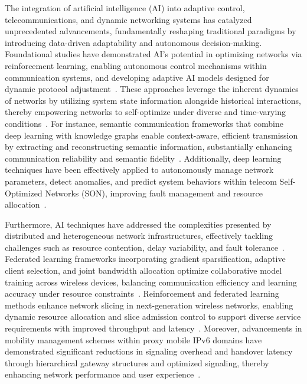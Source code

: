 \documentclass[sigconf]{acmart}
\begin{document}
The integration of artificial intelligence (AI) into adaptive control, telecommunications, and dynamic networking systems has catalyzed unprecedented advancements, fundamentally reshaping traditional paradigms by introducing data-driven adaptability and autonomous decision-making. Foundational studies have demonstrated AI's potential in optimizing networks via reinforcement learning, enabling autonomous control mechanisms within communication systems, and developing adaptive AI models designed for dynamic protocol adjustment~\cite{ref17,ref18,ref19,ref20}. These approaches leverage the inherent dynamics of networks by utilizing system state information alongside historical interactions, thereby empowering networks to self-optimize under diverse and time-varying conditions~\cite{ref1,ref2,ref3}. For instance, semantic communication frameworks that combine deep learning with knowledge graphs enable context-aware, efficient transmission by extracting and reconstructing semantic information, substantially enhancing communication reliability and semantic fidelity~\cite{ref1}. Additionally, deep learning techniques have been effectively applied to autonomously manage network parameters, detect anomalies, and predict system behaviors within telecom Self-Optimized Networks (SON), improving fault management and resource allocation~\cite{ref2}.

Furthermore, AI techniques have addressed the complexities presented by distributed and heterogeneous network infrastructures, effectively tackling challenges such as resource contention, delay variability, and fault tolerance~\cite{ref4,ref5,ref6}. Federated learning frameworks incorporating gradient sparsification, adaptive client selection, and joint bandwidth allocation optimize collaborative model training across wireless devices, balancing communication efficiency and learning accuracy under resource constraints~\cite{ref4,ref5}. Reinforcement and federated learning methods enhance network slicing in next-generation wireless networks, enabling dynamic resource allocation and slice admission control to support diverse service requirements with improved throughput and latency~\cite{ref6}. Moreover, advancements in mobility management schemes within proxy mobile IPv6 domains have demonstrated significant reductions in signaling overhead and handover latency through hierarchical gateway structures and optimized signaling, thereby enhancing network performance and user experience~\cite{ref19}.
\end{document}
